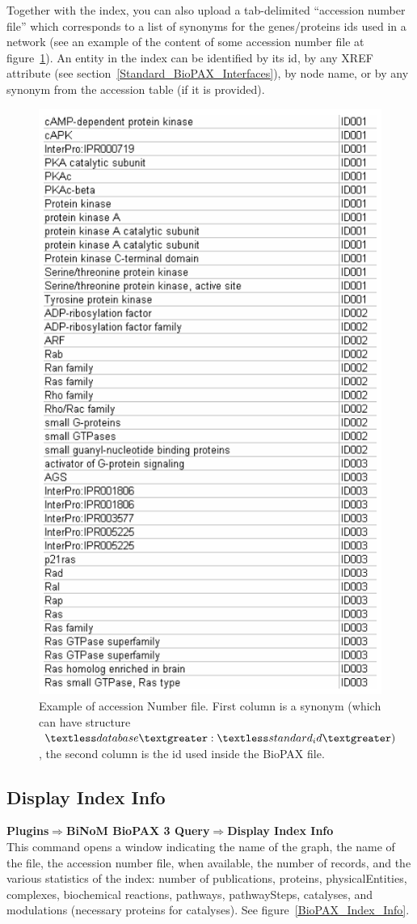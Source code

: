 Together with the index, you can also upload a tab-delimited “accession number
file” which corresponds to a list of synonyms for the genes/proteins ids used in
a network (see an example of the content of some accession number file at
figure~\ref{Accession_Number_File}). An entity in the index can be identified by
its id, by any XREF attribute (see section~\ref{Standard_BioPAX_Interfaces}), by
node name, or by any synonym from the accession table (if it is provided).

\begin{figure}
\centering
\includegraphics[width=8 cm]{graphics/Accession_Number_File}
\caption{Example of accession Number file. First column is a synonym (which can have structure $\textless database\textgreater :\textless standard_id\textgreater)$, the second column is the id used inside the BioPAX file.}
\label{Accession_Number_File}
\end{figure}

\subsection{Display Index Info}
\textbf{Plugins$\Rightarrow$BiNoM BioPAX 3 Query$\Rightarrow$Display Index Info}\\

This command opens a window indicating the name of the graph, the name of the
file, the accession number file, when available, the number of records, and the
various statistics of the index: number of publications, proteins,
physicalEntities, complexes, biochemical reactions, pathways, pathwaySteps,
catalyses, and modulations (necessary proteins for catalyses). See
figure~\ref{BioPAX_Index_Info}.

